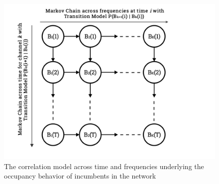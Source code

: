 \documentclass[10pt,twocolumn]{IEEEtran}
\begin{document}
\begin{figure}
    \centering
    \includegraphics[width=0.80\linewidth]{MarkovChainsVisualization}
    \vspace{-5mm}
    \caption{The correlation model across time and frequencies underlying the occupancy behavior of incumbents in the network}
    \vspace{-5mm}
    \label{fig:1}
\end{figure}
\end{document}

